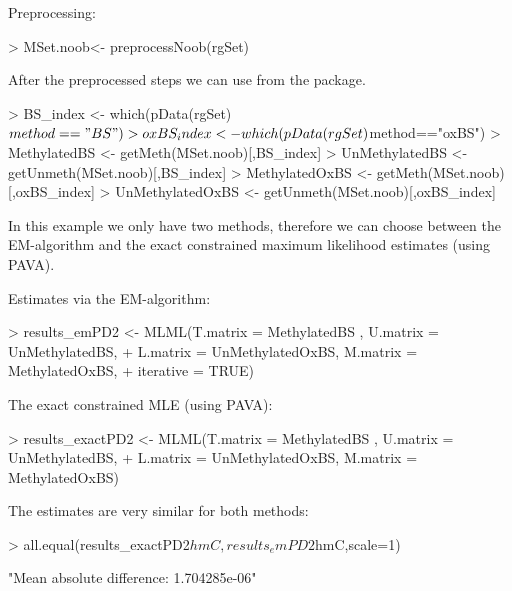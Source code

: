 \documentclass{article}
\begin{document}
Preprocessing:
\begin{Schunk}
\begin{Sinput}
> MSet.noob<- preprocessNoob(rgSet)
\end{Sinput}
\end{Schunk}


After the preprocessed steps we can use  from the  package.


\begin{Schunk}
\begin{Sinput}
> BS_index <- which(pData(rgSet)$method=="BS")
> oxBS_index <- which(pData(rgSet)$method=="oxBS")
> MethylatedBS <- getMeth(MSet.noob)[,BS_index]
> UnMethylatedBS <- getUnmeth(MSet.noob)[,BS_index]
> MethylatedOxBS <- getMeth(MSet.noob)[,oxBS_index]
> UnMethylatedOxBS <- getUnmeth(MSet.noob)[,oxBS_index]
\end{Sinput}
\end{Schunk}





In this example we only have two methods, therefore we can choose between the EM-algorithm and the exact constrained maximum likelihood estimates (using PAVA).

Estimates via the EM-algorithm:

\begin{Schunk}
\begin{Sinput}
> results_emPD2 <- MLML(T.matrix = MethylatedBS , U.matrix = UnMethylatedBS,
+                    L.matrix = UnMethylatedOxBS, M.matrix = MethylatedOxBS,
+                    iterative = TRUE)
\end{Sinput}
\end{Schunk}




The exact constrained MLE (using PAVA):

\begin{Schunk}
\begin{Sinput}
> results_exactPD2 <- MLML(T.matrix = MethylatedBS , U.matrix = UnMethylatedBS,
+                       L.matrix = UnMethylatedOxBS, M.matrix = MethylatedOxBS)
\end{Sinput}
\end{Schunk}

The estimates are very similar for both methods:
\begin{Schunk}
\begin{Sinput}
> all.equal(results_exactPD2$hmC,results_emPD2$hmC,scale=1)
\end{Sinput}
\begin{Soutput}
[1] "Mean absolute difference: 1.704285e-06"
\end{Soutput}
\end{Schunk}
\end{document}
